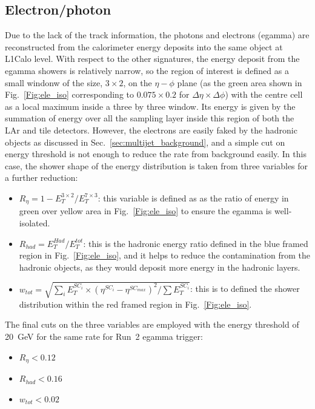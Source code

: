 \subsection{Electron/photon}
Due to the lack of the track information, the photons and electrons (egamma) are reconstructed from the calorimeter energy deposits into the same object at L1Calo level. With respect to the other signatures, the energy deposit from the egamma  showers is relatively narrow, so the region of interest is defined as a small windonw of the size, $3\times2$, on the $\eta-\phi$ plane (as the green area shown in Fig.~\ref{Fig:ele_iso} corresponding to $0.075\times0.2$ for $\Delta\eta\times\Delta\phi$) with the centre cell as a local maximum inside a three by three window. Its energy is given by the summation of energy over all the sampling layer inside this region of both the LAr and tile detectors. However, the electrons are easily faked by the hadronic objects as discussed in Sec.~\ref{sec:multijet_background}, and a simple cut on energy threshold is not enough to reduce the rate from background easily. In this case, the shower shape of the energy distribution is taken from three variables for a further reduction:
\begin{itemize}
	\item $R_\eta=1-E_{T}^{3\times2}/E_{T}^{7\times3}$: this variable is defined as as the ratio of energy in green over yellow area in Fig.~\ref{Fig:ele_iso} to ensure the egamma is well-isolated. 
	\item $R_{had} = E^{Had}_{T}/E^{tot}_{T}$: this is the hadronic energy ratio defined in the blue framed region in Fig.~\ref{Fig:ele_iso}, and it helps to reduce the contamination from the hadronic objects, as they would deposit more energy in the hadronic layers.
	\item $w_{tot}=\sqrt{\sum_i E^{SC_i}_{T}\times(\eta^{SC_i}-\eta^{SC_{max}})^2/\sum E^{SC_i}_{T}}$: this is to defined the shower distribution within the red framed region in Fig.~\ref{Fig:ele_iso}. 
\end{itemize}
The final cuts on the three variables are employed with the energy threshold of 20~GeV for the same rate for Run~2 egamma trigger:
\begin{itemize}
	\item $R_\eta<0.12$
	\item $R_{had}<0.16$
	\item $w_{tot}<0.02$
\end{itemize}

